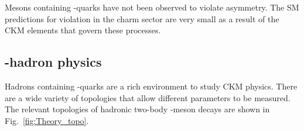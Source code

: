 Mesons containing \cquark-quarks have not been observed to violate \CP asymmetry. The SM predictions for \CP violation in the charm sector are very small as a result of the CKM elements that govern these processes.     


\subsection{\bquark-hadron physics}
Hadrons containing \bquark-quarks are a rich environment to study CKM physics. 
There are a wide variety of topologies that allow different parameters to be measured.
The relevant topologies of hadronic two-body \bquark-meson decays are shown in Fig.~\ref{fig:Theory_topo}. 


